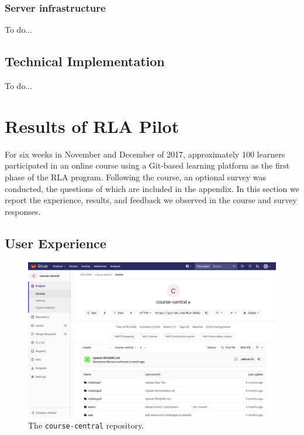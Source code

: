 \documentclass[12pt,twoside,vi]{mitthesis}
\newcommand{\wip}[1]{{\color{red} To do...}}
\begin{document}
\subsection{Server infrastructure}

\wip{reliance on other software (letsencrypt, nginx, python and javascript, bash)}

\section{Technical Implementation}

\wip{In this section we outline the initial implementation of the platform. We assume a technical background, in particular familiarity with Internet architecture and Git.
6.1 Server configuration
DigitalOcean droplet https://www.digitalocean.com/community/tutorials/how-to-install-and-configure-gitlab-on-ubuntu-16-04 
GitLab [built in for DO]
NameCheap domain and networking
nginx customization
Lets encrypt
6.2 Repo architecture
Brief overview of possibilities
Step by step description of how it all worked
6.3 Scripts
As much as possible, Git-related operations of the platform were automated to ease the burden on the instructors. 
Onboarding membership request poller
Onboarding group creation
Health check with email notifications
Create subtrees
Create merge request
Merge
Analyze progress}


\chapter{Results of RLA Pilot}

For six weeks in November and December of 2017, approximately 100 learners participated in an online course using a Git-based learning platform as the first phase of the RLA program. Following the course, an optional survey was conducted, the questions of which are included in the appendix. In this section we report the experience, results, and feedback we observed in the course and survey responses.

\section{User Experience}

\begin{figure}[H]
\centering
\includegraphics[scale=0.3]{fig-course-central.png}
\caption{The \texttt{course-central} repository.}
\end{figure}
\end{document}
